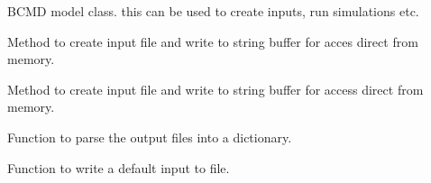 \documentclass[letterpaper,10pt,english]{sphinxmanual}
\begin{document}
\begin{fulllineitems}
\label{\detokenize{bcmdModel:bayescmd.bcmdModel.ModelBCMD}}
BCMD model class. this can be used to create inputs, run simulations etc.

\begin{fulllineitems}
\label{\detokenize{bcmdModel:bayescmd.bcmdModel.ModelBCMD.create_default_input}}
Method to create input file and write to string buffer for acces
direct from memory.

\end{fulllineitems}


\begin{fulllineitems}
\label{\detokenize{bcmdModel:bayescmd.bcmdModel.ModelBCMD.create_initialised_input}}
Method to create input file and write to string buffer for access
direct from memory.

\end{fulllineitems}


\begin{fulllineitems}
\label{\detokenize{bcmdModel:bayescmd.bcmdModel.ModelBCMD.output_parse}}
Function to parse the output files into a dictionary.

\end{fulllineitems}


\begin{fulllineitems}
\label{\detokenize{bcmdModel:bayescmd.bcmdModel.ModelBCMD.write_default_input}}
Function to write a default input to file.


\end{fulllineitems}
\end{fulllineitems}
\end{document}
